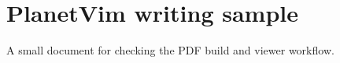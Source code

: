 \documentclass{article}
\begin{document}
\section{PlanetVim writing sample}
A small document for checking the PDF build and viewer workflow.
\end{document}
